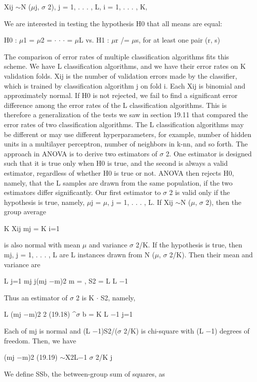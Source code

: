Xij $\sim$N ($\mu$j, $\sigma$ 2), j = 1, . . . , L, i = 1, . . . , K,

We are interested in testing the hypothesis H0 that all means are equal:

H0 : $\mu$1 = $\mu$2 = $\cdot$ $\cdot$ $\cdot$ = $\mu$L vs. H1 : $\mu$r /= $\mu$s, for at least one pair (r, s)

The comparison of error rates of multiple classification algorithms fits this scheme. We have L classification algorithms, and we have their error rates on K validation folds. Xij is the number of validation errors made by the classifier, which is trained by classification algorithm j on fold i. Each Xij is binomial and approximately normal. If H0 is not rejected, we fail to find a significant error difference among the error rates of the L classification algorithms. This is therefore a generalization of the tests we saw in section 19.11 that compared the error rates of two classification algorithms. The L classification algorithms may be different or may use different hyperparameters, for example, number of hidden units in a multilayer perceptron, number of neighbors in k-nn, and so forth. The approach in ANOVA is to derive two estimators of $\sigma$ 2. One estimator is designed such that it is true only when H0 is true, and the second is always a valid estimator, regardless of whether H0 is true or not. ANOVA then rejects H0, namely, that the L samples are drawn from the same population, if the two estimators differ significantly. Our first estimator to $\sigma$ 2 is valid only if the hypothesis is true, namely, $\mu$j = $\mu$, j = 1, . . . , L. If Xij $\sim$N ($\mu$, $\sigma$ 2), then the group average

K Xij mj = K i=1

is also normal with mean $\mu$ and variance $\sigma$ 2/K. If the hypothesis is true, then mj, j = 1, . . . , L are L instances drawn from N ($\mu$, $\sigma$ 2/K). Then their mean and variance are

L j=1 mj j(mj $-$m)2 m = , S2 = L L $-$1

Thus an estimator of $\sigma$ 2 is K $\cdot$ S2, namely,

L (mj $-$m)2 2 (19.18) \textasciicircum{}$\sigma$ b = K L $-$1 j=1

Each of mj is normal and (L $-$1)S2/($\sigma$ 2/K) is chi-square with (L $-$1) degrees of freedom. Then, we have

(mj $-$m)2 (19.19) $\sim$X2L$-$1 $\sigma$ 2/K j

We define SSb, the between-group sum of squares, as

